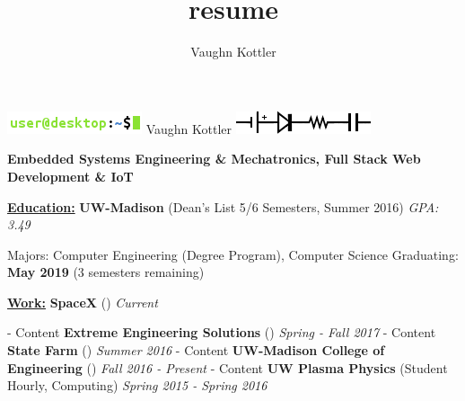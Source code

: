 \documentclass[letterpaper,10pt]{article}
\title{resume}
\author{Vaughn Kottler}
\begin{document}
\begin{center}\Huge
	\includegraphics[natwidth=150,natheight=25]{terminal.png}
	Vaughn Kottler
	\includegraphics[natwidth=150,natheight=25]{circuit.png}
\end{center}

\begin{center}\large
    \color{maroon}\textbf{
        Embedded Systems Engineering \& Mechatronics, Full Stack Web Development \& IoT
    }
\end{center}%

\noindent
\textbf{\underline{Education:}}\hspace{2.6em}%
%
\textbf{UW-Madison}
(Dean's List 5/6 Semesters, Summer 2016)
\textit{GPA: 3.49}
%
\begin{adjustwidth}{1.2in}{0in}
	Majors: Computer Engineering (Degree Program), Computer Science\break
	Graduating: \textbf{May 2019} (3 semesters remaining)\break
\end{adjustwidth}

\noindent
\textbf{\underline{Work:}}\hspace{5.6em}%
%
\textbf{SpaceX}
({\color{blue}\underline{}})
\textit{Current}
%
\begin{adjustwidth}{1.2in}{0in}
	- Content
	\break
	\textbf{Extreme Engineering Solutions}
	({\color{blue}\underline{}})
	\textit{Spring - Fall 2017}
	\break
	- Content
	\break
	\textbf{State Farm}
	({\color{blue}\underline{}})
	\textit{Summer 2016}
	\break
	- Content
	\break
	\textbf{UW-Madison College of Engineering}
	({\color{blue}\underline{}})
	\textit{Fall 2016 - Present}
	\break
	- Content
	\break
	\textbf{UW Plasma Physics}
	(Student Hourly, Computing)
	\textit{Spring 2015 - Spring 2016}
\end{adjustwidth}
\end{document}
